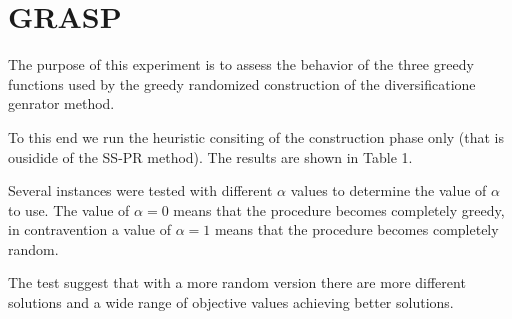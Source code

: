 \section{GRASP}
The purpose of this experiment
is to assess the behavior of the three greedy functions
used by the greedy randomized construction
of the diversificatione genrator method.

To this end
we run the heuristic consiting of
the construction phase only
(that is ousidide of the SS-PR method).
The results are shown in Table 1.

Several instances were tested
with different $\alpha$ values
to determine the value of $\alpha$ to use.
The value of $\alpha = 0$ means that
the procedure becomes completely greedy,
in contravention
a value of $\alpha = 1$ means that
the procedure becomes completely random.

The test suggest
that
with a more random version
there are more different solutions
and a wide range of objective values
achieving better solutions.
